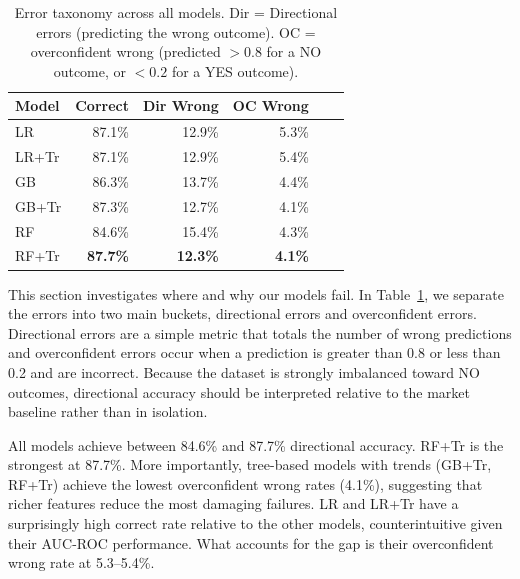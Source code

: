 \documentclass[11pt,twocolumn]{article}
\begin{document}
\begin{table}[h]
\centering
\footnotesize
\begin{tabular}{lrrrrr}
\toprule
\textbf{Model} & \textbf{Correct} & \textbf{Dir Wrong} & \textbf{OC Wrong} \\
\midrule
LR      & 87.1\% & 12.9\% & 5.3\% \\
LR+Tr   & 87.1\% & 12.9\% & 5.4\% \\
GB      & 86.3\% & 13.7\% & 4.4\% \\
GB+Tr   & 87.3\% & 12.7\% & 4.1\% \\
RF      & 84.6\% & 15.4\% & 4.3\% \\
RF+Tr   & \textbf{87.7\%} & \textbf{12.3\%} & \textbf{4.1\%} \\
\bottomrule
\end{tabular}
\caption{Error taxonomy across all models. Dir = Directional errors (predicting the wrong outcome). OC = overconfident wrong (predicted $> 0.8$ for a NO outcome, or $< 0.2$ for a YES outcome).}
\label{tab:error_taxonomy}
\end{table}
This section investigates where and why our models fail. In Table~\ref{tab:error_taxonomy}, we separate the errors into two main buckets, directional errors and overconfident errors. Directional errors are a simple metric that totals the number of wrong predictions and overconfident errors occur when a prediction is greater than 0.8 or less than 0.2 and are incorrect. Because the dataset is strongly imbalanced toward NO outcomes, directional accuracy should be interpreted relative to the market baseline rather than in isolation.

All models achieve between 84.6\% and 87.7\% directional accuracy. RF+Tr is the strongest at 87.7\%. More importantly, tree-based models with trends (GB+Tr, RF+Tr) achieve the lowest overconfident wrong rates (4.1\%), suggesting that richer features reduce the most damaging failures. LR and LR+Tr have a surprisingly high correct rate relative to the other models, counterintuitive given their AUC-ROC performance. What accounts for the gap is their overconfident wrong rate at 5.3--5.4\%.
\end{document}
